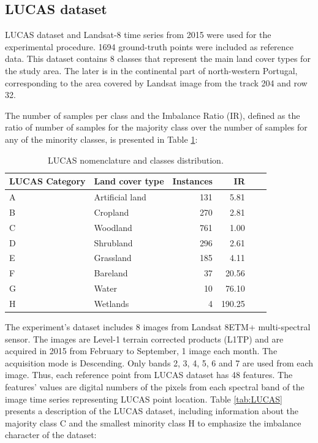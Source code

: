 \documentclass[remotesensing,article,submit,moreauthors,pdftex]{Definitions/mdpi}
\begin{document}
\subsection{LUCAS dataset}

LUCAS dataset and Landsat-8 time series from 2015 were used for the experimental
procedure. 1694 ground-truth points were included as reference data. This
dataset contains 8 classes that represent the main land cover types for the
study area. The later is in the continental part of north-western Portugal,
corresponding to the area covered by Landsat image from the track 204 and row
32.

The number of samples per class and the Imbalance Ratio (IR), defined as the ratio of
number of samples for the majority class over the number of samples for any of
the minority classes, is presented in Table \ref{tab:classes_distribution}:

\begin{table}[H]
	\centering
	\begin{tabular}{llrrrr}
		\toprule
		\textbf{LUCAS Category} & \textbf{Land cover type} & \textbf{Instances}
		& \textbf{IR} \\
		\hline
		A & Artificial land & 131 & 5.81 \\
		B & Cropland        & 270 & 2.81 \\
		C & Woodland        & 761 & 1.00 \\
		D & Shrubland       & 296 & 2.61 \\
		E & Grassland       & 185 & 4.11 \\
		F & Bareland        & 37  & 20.56 \\
		G & Water           & 10  & 76.10 \\
		H & Wetlands        & 4   & 190.25\\
		\bottomrule
	\end{tabular}
	\caption{\label{tab:classes_distribution}LUCAS nomenclature and classes distribution.}
\end{table}

The experiment's dataset includes 8 images from Landsat 8ETM+ multi-spectral
sensor. The images are Level-1 terrain corrected products (L1TP) and are
acquired in 2015 from February to September, 1 image each month. The acquisition
mode is Descending. Only bands 2, 3, 4, 5, 6 and 7 are used from each image.
Thus, each reference point from LUCAS dataset has 48 features. The features'
values are digital numbers of the pixels from each spectral band of the image
time series representing LUCAS point location. Table \ref{tab:LUCAS} presents a
description of the LUCAS dataset, including information about the majority class
C and the smallest minority class H to emphasize the imbalance character of the
dataset:
\end{document}
